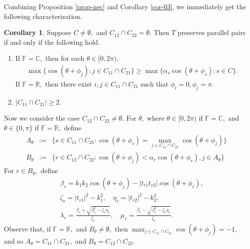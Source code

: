 \documentclass{amsart}
\theoremstyle{definition}
\newtheorem{cor}[theorem]{Corollary}
\theoremstyle{remark}
\numberwithin{equation}{section}
\begin{document}
Combining Proposition \ref{prop-nec} and Corollary \ref{cor-03}, we immediately get the following characterization.
\begin{cor}\label{cor-com}
	Suppose $C\neq \emptyset,$ and $C_{12}\cap C_{22}=\emptyset.$
	Then  $T$ preserves parallel pairs if and only if the following hold.
	\begin{enumerate}
		\item If $\mathbb{F}=\mathbb{C},$ then for each $\theta\in [0,2\pi),$
		\begin{equation}\label{eq-006}
			\begin{split}
				\max\{\cos(\theta+\phi_j):j\in C_{11}\cap C_{21}\}
				\geq  \max\Big\{\alpha_s\cos(\theta+\phi_s):s\in C\Big\}.	
			\end{split}
		\end{equation}	
	If $\mathbb{F}=\mathbb{R},$ then  there exist $i,j\in C_{11}\cap C_{21}$ such that $\phi_i=0,\phi_j=\pi.$
		\item $|C_{11}\cap C_{21}|\geq 2.$
	\end{enumerate}
\end{cor}

Now we consider the case  $C_{12}\cap C_{22}\neq \emptyset.$ %
For $\theta,$ where $\theta\in [0,2\pi)$ if $\mathbb{F}=\mathbb{C},$ and $\theta\in \{0,\pi\}$ if $\mathbb{F}=\mathbb{R},$ define 
\begin{eqnarray*}
	A_\theta&:=&\Big\{s\in  C_{11}\cap C_{21}:\cos(\theta+\phi_s)=\max_{j\in C_{11}\cap C_{21}}\cos(\theta+\phi_j)\Big\}\\
	B_{\theta}&:=&\Big\{r\in  C_{12}\cap C_{22}:\cos(\theta+\phi_j)<\alpha_r\cos(\theta+\phi_r), j\in A_\theta \Big\}
\end{eqnarray*}
For $r\in B_\theta,$ define
\begin{eqnarray*}
	&&\beta_{r}=k_1k_2\cos(\theta+\phi_j)-|t_{r1}t_{r2}|\cos(\theta+\phi_r), \\
	&& \zeta_{r}=|t_{r1}|^2-k_1^2,\quad \eta_r=|t_{r2}|^2-k_2^2,\\
	&&\lambda_{r}=\frac{\beta_{r}+\sqrt{\beta_{r}^2-\zeta_r\eta_r}}{\zeta_r},\quad \mu_{r}=\frac{\beta_{r}-\sqrt{\beta_{r}^2-\zeta_r\eta_r}}{\zeta_r}.
\end{eqnarray*}
Observe that, if $\mathbb{F}=\mathbb{R},$ and $B_\theta\neq \emptyset,$ then  $	\max_{j\in C_{11}\cap C_{21}}\cos(\theta+\phi_j)=-1,$ and so  $A_\theta=C_{11}\cap C_{21},$ and $B_\theta=C_{12}\cap C_{22}.$
\end{document}
